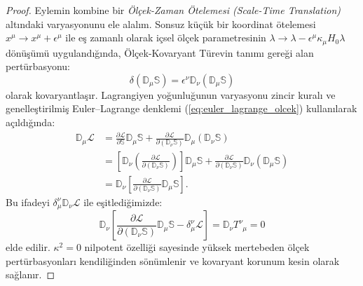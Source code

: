 \documentclass[11pt,a4paper]{article}
\begin{document}
\begin{proof}
    Eylemin kombine bir \textit{Ölçek-Zaman Ötelemesi (Scale-Time Translation)} altındaki varyasyonunu ele alalım. Sonsuz küçük bir koordinat ötelemesi $x^\mu \to x^\mu + \epsilon^\mu$ ile eş zamanlı olarak içsel ölçek parametresinin $\lambda \to \lambda - \epsilon^\mu \kappa_\mu H_0 \lambda$ dönüşümü uygulandığında, Ölçek-Kovaryant Türevin tanımı gereği alan pertürbasyonu:
    $$\delta (\mathbb{D}_\mu \mathbb{S}) = \epsilon^\nu \mathbb{D}_\nu (\mathbb{D}_\mu \mathbb{S})$$
    olarak kovaryantlaşır. Lagrangiyen yoğunluğunun varyasyonu zincir kuralı ve genelleştirilmiş Euler--Lagrange denklemi (\ref{eq:euler_lagrange_olcek}) kullanılarak açıldığında:
    \begin{align*}
        \mathbb{D}_\mu \mathcal{L} & = \frac{\partial \mathcal{L}}{\partial \mathbb{S}} \mathbb{D}_\mu \mathbb{S} + \frac{\partial \mathcal{L}}{\partial (\mathbb{D}_\nu \mathbb{S})} \mathbb{D}_\mu (\mathbb{D}_\nu \mathbb{S})                                                               \\
                                   & = \left[ \mathbb{D}_\nu \left( \frac{\partial \mathcal{L}}{\partial (\mathbb{D}_\nu \mathbb{S})} \right) \right] \mathbb{D}_\mu \mathbb{S} + \frac{\partial \mathcal{L}}{\partial (\mathbb{D}_\nu \mathbb{S})} \mathbb{D}_\nu (\mathbb{D}_\mu \mathbb{S}) \\
                                   & = \mathbb{D}_\nu \left[ \frac{\partial \mathcal{L}}{\partial (\mathbb{D}_\nu \mathbb{S})} \mathbb{D}_\mu \mathbb{S} \right].
    \end{align*}
    Bu ifadeyi $\delta^\nu_\mu \mathbb{D}_\nu \mathcal{L}$ ile eşitlediğimizde:
    $$\mathbb{D}_\nu \left[ \frac{\partial \mathcal{L}}{\partial (\mathbb{D}_\nu \mathbb{S})} \mathbb{D}_\mu \mathbb{S} - \delta^\nu_\mu \mathcal{L} \right] = \mathbb{D}_\nu T^\nu_{\phantom{\nu}\mu} = 0$$
    elde edilir. $\kappa^2 = 0$ nilpotent özelliği sayesinde yüksek mertebeden ölçek pertürbasyonları kendiliğinden sönümlenir ve kovaryant korunum kesin olarak sağlanır.
\end{proof}
\end{document}
